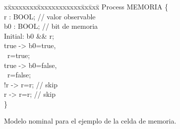 \begin{figure}[t]
\centering
\begin{minipage}[t]{.47\textwidth}
\fontsize{10}{10}\selectfont\ttfamily
\begin{tabbing}
x\=xxxxxxxx\=xxxxxxxxxxxx\=xx\=xxx\= \kill    
Process MEMORIA \{\\[1ex]
\>r : BOOL;  // valor observable \\ 
\>b0 : BOOL; // bit de memoria\\[1ex]
\>Initial: b0 \&\& r;\\[1ex]
\>[write1]  true -> b0=true, \\
\>\>~r=true; \\
\>[write0]  true -> b0=false, \\
\>\>~r=false; \\
\>[read0] !r -> r=r; // skip \\
\>[read1]  r -> r=r; // skip \\[1ex]
\}\\
\end{tabbing}
\end{minipage}
\caption{Modelo nominal para el ejemplo de la celda de memoria.} \label{fig:exam_1_mem_cell_nominal}
\end{figure}

\hfill


